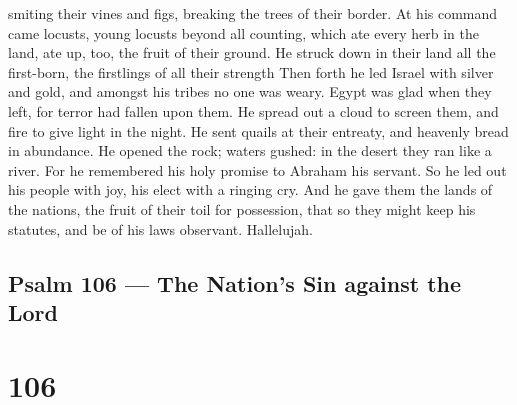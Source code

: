 smiting their vines and figs, breaking the trees of their border.
 At his command came locusts, young locusts beyond all
counting,  which ate every herb in the land, ate up, too,
the fruit of their ground.  He struck down in their land
all the first-born, the firstlings of all their strength 
Then forth he led Israel with silver and gold, and amongst his tribes no
one was weary.  Egypt was glad when they left, for terror
had fallen upon them.  He spread out a cloud to screen
them, and fire to give light in the night.  He sent quails
at their entreaty, and heavenly bread in abundance.  He
opened the rock; waters gushed: in the desert they ran like a river.
 For he remembered his holy promise to Abraham his servant.
 So he led out his people with joy, his elect with a
ringing cry.  And he gave them the lands of the nations,
the fruit of their toil for possession,  that so they might
keep his statutes, and be of his laws observant. Hallelujah.

\hypertarget{psalm-106-the-nations-sin-against-the-lord}{%
\subsection{Psalm 106 --- The Nation's Sin against the
Lord}\label{psalm-106-the-nations-sin-against-the-lord}}

\hypertarget{section-105}{%
\section{106}\label{section-105}}

